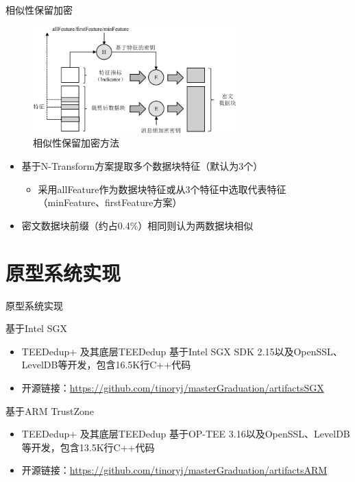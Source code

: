 \documentclass{beamer}
\newcommand{\sysnameS}{TEEDedup }
\newcommand{\prototype}{TEEDedup+ }
\begin{document}
\begin{frame}{相似性保留加密}
    \begin{figure}[!htb]
        \centering
        \includegraphics[width=0.7\textwidth]{../pic/featurespy/spe.pdf}
        \caption{相似性保留加密方法}
        \label{fig:featurespy-design-spe}
    \end{figure}
    \vspace{-1.5em}
    \begin{itemize}
        \item
              基于N-Transform方案提取多个数据块特征（默认为3个）
              \begin{itemize}
                  \item 采用allFeature作为数据块特征或从3个特征中选取代表特征（minFeature、firstFeature方案）
              \end{itemize}
        \item  密文数据块前缀（约占0.4\%）相同则认为两数据块相似
    \end{itemize}
\end{frame}

\section{原型系统实现}

\begin{frame}{原型系统实现}
    \begin{textbox}{基于Intel SGX}
        \begin{itemize}
            \item \prototype 及其底层\sysnameS 基于Intel SGX SDK 2.15以及OpenSSL、LevelDB等开发，包含16.5K行C++代码
            \item 开源链接：\href{https://github.com/tinoryj/masterGraduation/artifactsSGX}{https://github.com/tinoryj/masterGraduation/artifactsSGX}
        \end{itemize}
    \end{textbox}

    \begin{textbox}{基于ARM TrustZone}
        \begin{itemize}
            \item \prototype 及其底层\sysnameS 基于OP-TEE 3.16以及OpenSSL、LevelDB等开发，包含13.5K行C++代码
            \item 开源链接：\href{https://github.com/tinoryj/masterGraduation/artifactsARM}{https://github.com/tinoryj/masterGraduation/artifactsARM}
        \end{itemize}
    \end{textbox}
\end{frame}
\end{document}
